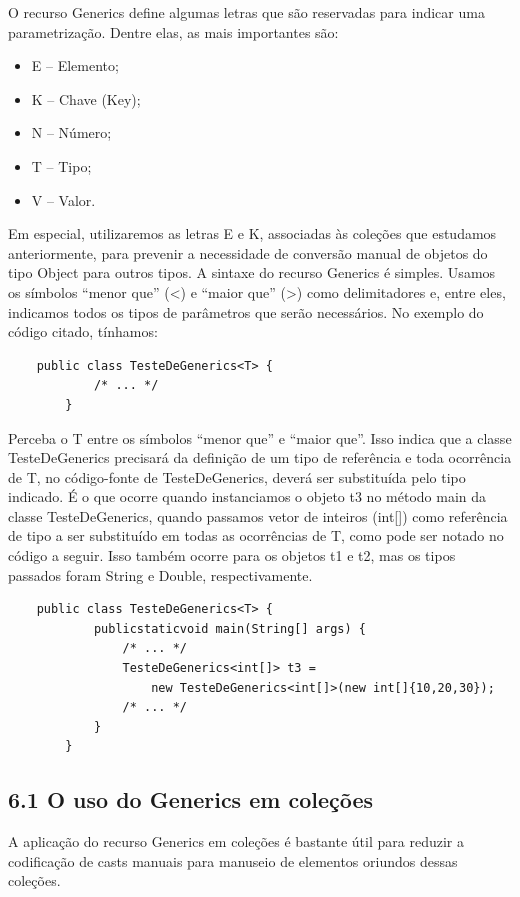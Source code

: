 \documentclass[11pt]{article}
\begin{document}
O recurso Generics define algumas letras que são reservadas para indicar uma parametrização. Dentre elas, as mais importantes são:

\begin{itemize}
\item E – Elemento;
\item K – Chave (Key);
\item N – Número;
\item T – Tipo;
\item V – Valor.
\end{itemize}

Em especial, utilizaremos as letras E e K, associadas às coleções que estudamos anteriormente, para prevenir a necessidade de conversão manual de objetos do tipo Object para outros tipos. A sintaxe do recurso Generics é simples. Usamos os símbolos “menor que” (<) e “maior que” (>) como delimitadores e, entre eles, indicamos todos os tipos de parâmetros que serão necessários. No exemplo do código citado, tínhamos:


\begin{verbatim}
    public class TesteDeGenerics<T> {
            /* ... */
        }
\end{verbatim}

Perceba o T entre os símbolos “menor que” e “maior que”. Isso indica que a classe TesteDeGenerics precisará da definição de um tipo de referência e toda ocorrência de T, no código-fonte de TesteDeGenerics, deverá ser substituída pelo tipo indicado. É o que ocorre quando instanciamos o objeto t3 no método main da classe TesteDeGenerics, quando passamos vetor de inteiros (int[]) como referência de tipo a ser substituído em todas as ocorrências de T, como pode ser notado no código a seguir. Isso também ocorre para os objetos t1 e t2, mas os tipos passados foram String e Double, respectivamente.

\begin{verbatim}
    public class TesteDeGenerics<T> {
            publicstaticvoid main(String[] args) {
                /* ... */
                TesteDeGenerics<int[]> t3 =
                    new TesteDeGenerics<int[]>(new int[]{10,20,30});
                /* ... */
            }
        }
\end{verbatim}

\subsection{6.1 O uso do Generics em coleções}
\label{sec:orgdac784c}
A aplicação do recurso Generics em coleções é bastante útil para reduzir a codificação de casts manuais para manuseio de elementos oriundos dessas coleções.
\end{document}
